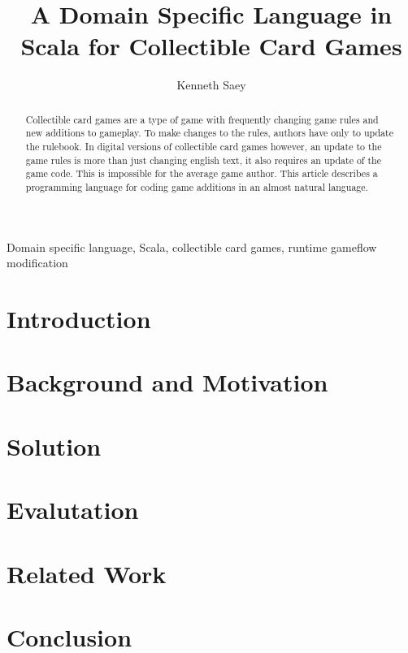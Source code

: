 \documentclass[twocolumn]{../phdsymp}
\begin{document}
\title{A Domain Specific Language in Scala for Collectible Card Games} %

\author{Kenneth Saey}


\maketitle

\begin{abstract}
Collectible card games are a type of game with frequently changing game rules and new additions to gameplay. To make changes to the rules, authors have only to update the rulebook. In digital versions of collectible card games however, an update to the game rules is more than just changing english text, it also requires an update of the game code. This is impossible for the average game author. This article describes a programming language for coding game additions in an almost natural language.
\end{abstract}

\begin{keywords}
Domain specific language, Scala, collectible card games, runtime gameflow modification
\end{keywords}

\section{Introduction}
\label{Introduction}


\section{Background and Motivation}
\label{Background and Motivation}


\section{Solution}
\label{Solution}


\section{Evalutation}
\label{Evaluation}


\section{Related Work}
\label{Related Work}


\section{Conclusion}
\label{Conclusion}




\end{document}
